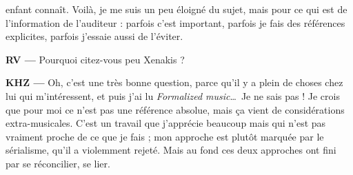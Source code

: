 \documentclass[a4paper,12pt]{article}
\begin{document}
enfant connaît. Voilà, je me suis un peu éloigné du sujet, mais pour ce qui est de l'information de l'auditeur : parfois c'est important, parfois je fais des références explicites, parfois j'essaie aussi de l'éviter.

\textbf{RV ---} Pourquoi citez-vous peu Xenakis ?

\textbf{KHZ ---} Oh, c'est une très bonne question, parce qu'il y a plein de choses chez lui qui m'intéressent, et puis j'ai lu \emph{Formalized music}\dots~Je ne sais pas ! Je crois que pour moi ce n'est pas une référence absolue, mais ça vient de considérations extra-musicales. C'est un travail que j'apprécie beaucoup mais qui n'est pas vraiment proche de ce que je fais ; mon approche est plutôt marquée par le sérialisme, qu'il a violemment rejeté. Mais au fond ces deux approches ont fini par se réconcilier, se lier.



%
%
%
%
%
\end{document}

